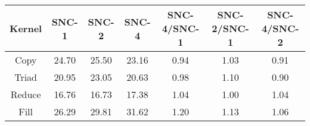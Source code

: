 \begin{tabular}{|c|c|c|c|c|c|c|}  \hline
Kernel&SNC-1&SNC-2&SNC-4 & SNC-4/SNC-1 & SNC-2/SNC-1 & SNC-4/SNC-2 \\ \hline 
Copy & 24.70 & 25.50 & 23.16  & 0.94 & 1.03 & 0.91 \\ \hline 
Triad & 20.95 & 23.05 & 20.63  & 0.98 & 1.10 & 0.90 \\ \hline 
Reduce & 16.76 & 16.73 & 17.38  & 1.04 & 1.00 & 1.04 \\ \hline 
Fill & 26.29 & 29.81 & 31.62  & 1.20 & 1.13 & 1.06 \\ \hline 
\end{tabular}
